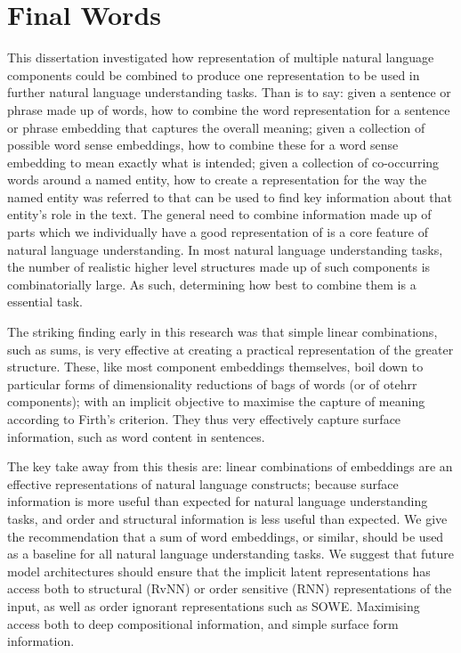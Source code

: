 \documentclass{book}
\begin{document}
\section{Final Words}
This dissertation investigated how representation of multiple natural language components could be combined to produce one representation to be used in further natural language understanding tasks.
Than is to say: given a sentence or phrase made up of words, how to combine the word representation for a sentence or phrase  embedding that captures the overall meaning;
given a collection of possible word sense embeddings, how to combine these for a word sense embedding to mean exactly what is intended;
given a collection of co-occurring words around a named entity, how to create a representation for the way the named entity was referred to that can be used to find key information about that entity's role in the text.
The general need to combine information made up of parts which we individually have a good representation of is a core feature of natural language understanding.
In most natural language understanding tasks, the number of realistic higher level structures made up of such components is combinatorially large.
As such, determining how best to combine them is a essential task.

The striking finding early in this research was that simple linear combinations, such as sums, is very effective at creating a practical representation of the greater structure.
These, like most component embeddings themselves, boil down to particular forms of dimensionality reductions of bags of words (or of otehrr components); with an implicit objective to maximise the capture of meaning according to Firth's criterion.
They thus very effectively capture surface information, such as word content in sentences.

The key take away from this thesis are:
linear combinations of embeddings are an effective representations of natural language constructs;
because surface information is more useful than expected for natural language understanding tasks,
and order and structural information is less useful than expected.
We give the recommendation that a sum of word embeddings, or similar, should be used 
as a baseline for all natural language understanding tasks. 
We suggest that future model architectures should ensure that the implicit latent representations
has access both to structural (RvNN) or order sensitive (RNN) representations of the input,
as well as order ignorant representations such as SOWE.
Maximising access both to deep compositional information,
and simple surface form information. 


 
\end{document}
